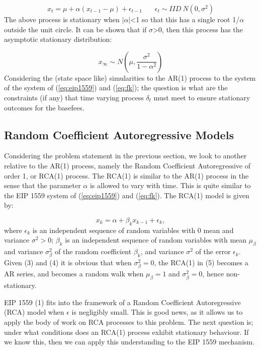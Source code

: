 \documentclass[peerreview]{ieeesyscoin}
\begin{document}
\begin{equation}
x_{t} = \mu + \alpha (x_{t-1} -\mu) + \epsilon_{t-1} ~~~~~~~~ \epsilon_{t} \sim IID~N(0,\sigma^2)
\label{eq:ar1} \tag{5}
\end{equation}
The above process is stationary when $|\alpha|$<1 so that this has a single root 1/$\alpha$ outside the unit circle.  It can be shown that if $\sigma$>0, then this process has the asymptotic stationary distribution:

\begin{equation}
x_{\infty} \sim N(\mu,\frac{\sigma^2}{1-\alpha^2})
\label{eq:x_infinity} \tag{6}
\end{equation}
Considering the (state space like) simularities to the AR(1) process to the system of the system of (\ref{eq:eip1559}) and (\ref{eq:fk}); the question is what are the constraints (if any) that time varying process $\delta_{t}$ must meet to ensure stationary outcomes for the basefees.

\subsection{Random Coefficient Autoregressive Models}
\label{section:rca}

Considering the problem statement in the previous section, we look to another relative to the AR(1) process, namely the Random Coefficient Autoregressive of order 1, or RCA(1) process. The RCA(1) is similar to the AR(1) process in the sense that the parameter $\alpha$ is allowed to vary with time. This is quite similar to the EIP 1559 system of (\ref{eq:eip1559}) and (\ref{eq:fk}). The RCA(1) model is given by:

\begin{equation}
x_{k} = \alpha + \beta_{k}x_{k-1} + \epsilon_{k},
\label{eq:rca1} \tag{7}
\end{equation}
where ${\epsilon_{k}}$ is an independent sequence of random variables with 0 mean and variance $\sigma^2 > 0$; ${\beta_{k}}$ is an independent sequence of random variables with mean $\mu_{\beta}$ and variance $\sigma_{\beta}^2$ of the random coefficient $\beta_{k}$, and variance $\sigma^2$ of the error $\epsilon_{k}$. Given (3) and (4) it is obvious that when $\sigma_{\beta}^2 = 0$, the RCA(1) in (5) becomes a AR series, and becomes a random walk when $\mu_{\beta} = 1$ and $\sigma_{\beta}^2 = 0$, hence non-stationary. 

EIP 1559 (1) fits into the framework of a Random Coefficient Autoregressive (RCA) model when $\epsilon$ is negligibly small. This is good news, as it allows us to apply the body of work on RCA processes to this problem. The next question is; under what conditions does an RCA(1) process exhibit stationary behaviour. If we know this, then we can apply this understanding to the EIP 1559 mechanism.
\end{document}

